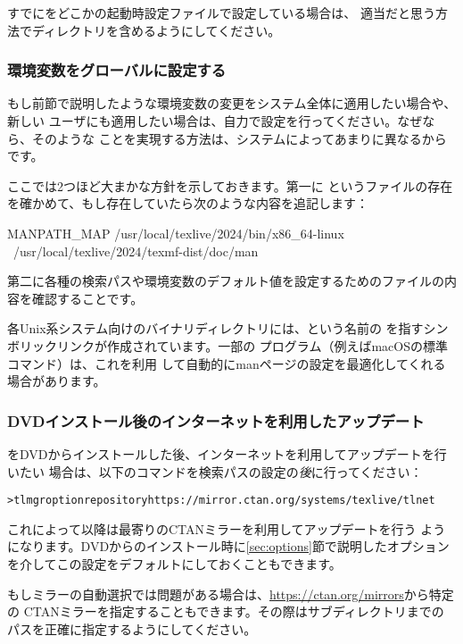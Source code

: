 \documentclass[uplatex,dvipdfmx,12pt]{jsarticle}
\begin{document}
すでにをどこかの起動時設定ファイルで設定している場合は、
適当だと思う方法で\TL ディレクトリを含めるようにしてください。

\subsubsection{環境変数をグローバルに設定する}
\label{sec:envglobal}

もし前節で説明したような環境変数の変更をシステム全体に適用したい場合や、新しい
ユーザにも適用したい場合は、自力で設定を行ってください。なぜなら、そのような
ことを実現する方法は、システムによってあまりに異なるからです。

ここでは2つほど大まかな方針を示しておきます。第一に%
というファイルの存在を確かめて、もし存在していたら次のような内容を追記します：
%
\begin{sverbatim}
MANPATH_MAP /usr/local/texlive/2024/bin/x86_64-linux \
            /usr/local/texlive/2024/texmf-dist/doc/man
\end{sverbatim}
%
第二に各種の検索パスや環境変数のデフォルト値を設定するためのファイルの内容を確認することです。

各Unix系システム向けのバイナリディレクトリには、という名前の
を指すシンボリックリンクが作成されています。一部の
プログラム（例えばmacOSの標準コマンド）は、これを利用
して自動的にmanページの設定を最適化してくれる場合があります。

\subsubsection{DVDインストール後のインターネットを利用したアップデート}
\label{sec:dvd-install-net-updates}

\TL をDVDからインストールした後、インターネットを利用してアップデートを行いたい
場合は、以下のコマンドを検索パスの設定の\emph{後}に行ってください：
%
\begin{alltt}
> tlmgr option repository https://mirror.ctan.org/systems/texlive/tlnet
\end{alltt}
%
これによって以降は最寄りのCTANミラーを利用してアップデートを行う
ようになります。DVDからのインストール時に\ref{sec:options}節で説明したオプション
を介してこの設定をデフォルトにしておくこともできます。

もしミラーの自動選択では問題がある場合は、\url{https://ctan.org/mirrors}から特定の
CTANミラーを指定することもできます。その際はサブディレクトリまでの
パスを正確に指定するようにしてください。
\end{document}
